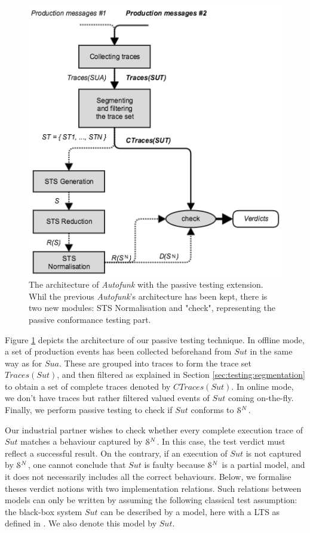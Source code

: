 \begin{figure}[ht]
\includegraphics[width=0.85\linewidth]{figures/passive_autofunk.png}

\caption{The architecture of \textit{Autofunk} with the passive testing
extension. Whil the previous \textit{Autofunk}'s architecture has been
kept, there is two new modules: STS Normalisation and "check",
representing the passive conformance testing part.}
\label{fig:passive-autofunk}
\end{figure}

Figure \ref{fig:passive-autofunk} depicts the architecture of our
passive testing technique. In offline mode, a set of production
events has been collected beforehand from $\mathit{Sut}$ in the
same way as for $\mathit{Sua}$. These are grouped into traces to
form the trace set $Traces({Sut})$, and then filtered as
explained in Section \ref{sec:testing:segmentation} to obtain a
set of complete traces denoted by $CTraces({Sut})$. In online
mode, we don't have traces but rather filtered valued events of
$\mathit{Sut}$ coming on-the-fly. Finally, we perform passive
testing to check if $\mathit{Sut}$ conforms to
$\EuScript{S}^{N}$.


Our industrial partner wishes to check whether every complete
execution trace of $\mathit{Sut}$ matches a behaviour captured by
$\EuScript{S}^{N}$. In this case, the test verdict must reflect a
successful result. On the contrary, if an execution of
$\mathit{Sut}$ is not captured by $\EuScript{S}^{N}$, one cannot
conclude that $\mathit{Sut}$ is faulty because $\EuScript{S}^{N}$
is a partial model, and it does not necessarily includes all the
correct behaviours. Below, we formalise theses verdict notions
with two implementation relations. Such relations between models
can only be written by assuming the following classical test
assumption: the black-box system $\mathit{Sut}$ can be described
by a model, here with a LTS as defined in
. We also
denote this model by $\mathit{Sut}$.

